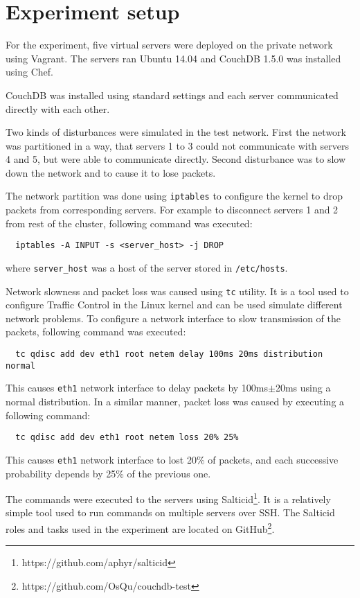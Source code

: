 \section{Experiment setup}


For the experiment, five virtual servers were deployed on the private network
using Vagrant. The servers ran Ubuntu 14.04 and CouchDB 1.5.0 was installed
using Chef.

CouchDB was installed using standard settings and each server communicated
directly with each other.

Two kinds of disturbances were simulated in the test network. First the network
was partitioned in a way, that servers 1 to 3 could not communicate with servers
4 and 5, but were able to communicate directly. Second disturbance was to slow
down the network and to cause it to lose packets.

The network partition was done using \texttt{iptables} to configure the kernel
to drop packets from corresponding servers. For example to disconnect servers 1
and 2 from rest of the cluster, following command was executed:

\begin{verbatim}
  iptables -A INPUT -s <server_host> -j DROP
\end{verbatim}

where \texttt{server\_host} was a host of the server stored in
\texttt{/etc/hosts}.

Network slowness and packet loss was caused using \texttt{tc} utility. It is a
tool used to configure Traffic Control in the Linux kernel and can be used
simulate different network problems. To configure a network interface to slow
transmission of the packets, following command was executed:

\begin{verbatim}
  tc qdisc add dev eth1 root netem delay 100ms 20ms distribution normal
\end{verbatim}

This causes \texttt{eth1} network interface to delay packets by 100ms\(\pm\)20ms
using a normal distribution. In a similar manner, packet loss was caused by
executing a following command:

\begin{verbatim}
  tc qdisc add dev eth1 root netem loss 20% 25%
\end{verbatim}

This causes \texttt{eth1} network interface to lost 20\% of packets, and each
successive probability depends by 25\% of the previous one.

The commands were executed to the servers using
Salticid\footnote{https://github.com/aphyr/salticid}. It is a relatively simple
tool used to run commands on multiple servers over SSH\@. The Salticid roles and
tasks used in the experiment are located on
GitHub\footnote{https://github.com/OsQu/couchdb-test}.
